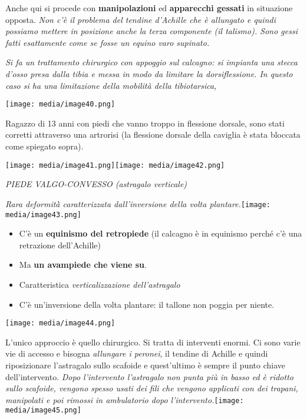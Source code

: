 \documentclass[]{article}
\begin{document}
Anche qui si procede con \textbf{manipolazioni} ed \textbf{apparecchi
gessati} in situazione opposta. \emph{Non c'è il problema del tendine
d'Achille che è allungato e quindi possiamo mettere in posizione anche
la terza componente (il talismo). Sono gessi fatti esattamente come se
fosse un equino varo supinato.}

\emph{Si fa un trattamento chirurgico con appoggio sul calcagno: si
impianta una stecca d'osso presa dalla tibia e messa in modo da limitare
la dorsiflessione. In questo caso si ha una limitazione della mobilità
della tibiotarsica,}

\texttt{[image: media/image40.png]}

Ragazzo di 13 anni con piedi che vanno troppo in flessione dorsale, sono
stati corretti attraverso una artrorisi (la flessione dorsale della
caviglia è stata bloccata come spiegato sopra).

\texttt{[image: media/image41.png]}\texttt{[image: media/image42.png]}

\emph{PIEDE VALGO-CONVESSO (astragalo verticale)}

\emph{Rara deformità̀ caratterizzata dall'inversione della volta
plantare.}\texttt{[image: media/image43.png]}

\begin{itemize}
\item
  C'è un \textbf{equinismo del retropiede} (il calcagno è in equinismo
  perché c'è una retrazione dell'Achille)
\item
  Ma \textbf{un avampiede che viene su}.
\item
  Caratteristica \emph{verticalizzazione dell'astragalo}
\item
  C'è un'inversione della volta plantare: il tallone non poggia per
  niente.
\end{itemize}

\texttt{[image: media/image44.png]}

L'unico approccio è quello chirurgico. Si tratta di interventi enormi.
Ci sono varie vie di accesso e bisogna \emph{allungare i peronei}, il
tendine di Achille e quindi riposizionare l'astragalo sullo scafoide e
quest'ultimo è sempre il punto chiave dell'intervento. \emph{Dopo
l'intervento l'astragalo non punta più in basso ed è ridotto sullo
scafoide, vengono spesso usati dei fili che vengono applicati con dei
trapani, manipolati e poi rimossi in ambulatorio dopo
l'intervento.}\texttt{[image: media/image45.png]}
\end{document}
